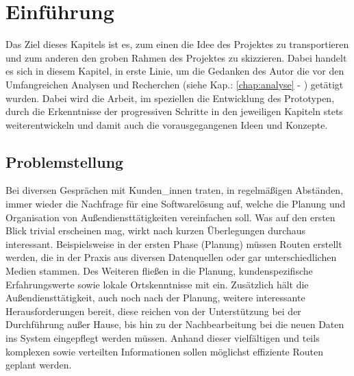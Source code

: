 \documentclass[Bachelorarbeit.tex]{subfiles}
\begin{document}
\chapter{Einführung}
\label{chap:einfuehrung}

Das Ziel dieses Kapitels ist es, zum einen die Idee des Projektes zu transportieren und zum anderen den groben Rahmen des Projektes zu skizzieren.
Dabei handelt es sich in diesem Kapitel, in erste Linie, um die Gedanken des Autor die vor den Umfangreichen Analysen und Recherchen (siehe Kap.: \ref{chap:analyse} - ) getätigt wurden.
Dabei wird die Arbeit, im speziellen die Entwicklung des Prototypen, durch die Erkenntnisse der progressiven Schritte in den jeweiligen Kapiteln stets weiterentwickeln und damit auch die vorausgegangenen Ideen und Konzepte.


\section{Problemstellung}
\label{chap:einfuehrung:sec:problemstellung}

Bei diversen Gesprächen mit Kunden\_innen traten, in regelmäßigen Abständen, immer wieder die Nachfrage für eine Softwarelösung auf, welche die Planung und Organisation von Außendiensttätigkeiten vereinfachen soll. 
Was auf den ersten Blick trivial erscheinen mag, wirkt nach kurzen Überlegungen durchaus interessant. 
Beispielsweise in der ersten Phase (Planung) müssen Routen erstellt werden, die in der Praxis aus diversen Datenquellen oder gar unterschiedlichen Medien stammen. 
Des Weiteren fließen in die Planung, kundenspezifische Erfahrungswerte sowie lokale Ortskenntnisse mit ein.
Zusätzlich hält die Außendiensttätigkeit, auch noch nach der Planung, weitere interessante Herausforderungen bereit, diese reichen von der Unterstützung bei der Durchführung außer Hause,  bis hin zu der Nachbearbeitung bei die neuen Daten ins System eingepflegt werden müssen.
Anhand dieser vielfältigen und teils komplexen sowie verteilten Informationen sollen möglichst effiziente Routen geplant werden. 


\begin{comment}
Als Grundlage für den Prototypen dient die Software Pery der Firma Perfany GmbH. 
Dabei handelt es sich um 
Wobei der Fokus auf dem Ticket Modul der Software ruht. Dabei ist das Anwendungskonzept des Moduls so ausgelegt das sämtliche Aufgaben, die die Firma betreffen , einzeln als Tickets erfasst werden. 
\end{comment}
\end{document}
